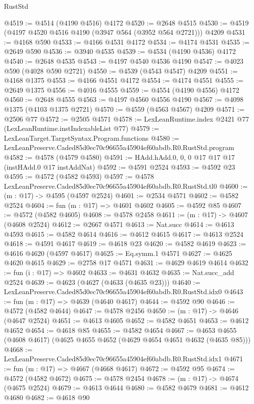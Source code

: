 \begin{lexlean}{RustStd}
\begin{coremodule}
@4519 := @4514 (@4190 @4516) @4172
@4520 := @2648 @4515
@4530 := @4519 (@4197 @4520 @4516 @4190 (@3947 @564 (@3952 @564 @2721))) @4209
@4531 := @4168 @590
@4533 := @4166 @4531 @4172
@4534 := @4174 @4531
@4535 := @2649 @590
@4536 := @3940 @4535
@4539 := @4534 (@4190 @4536) @4172
@4540 := @2648 @4535
@4543 := @4197 @4540 @4536 @4190
@4547 := @4023 @590 (@4028 @590 @2721)
@4550 := @4539 (@4543 @4547) @4209
@4551 := @4168 @1375
@4553 := @4166 @4551 @4172
@4554 := @4174 @4551
@4555 := @2649 @1375
@4556 := @4016 @4555
@4559 := @4554 (@4190 @4556) @4172
@4560 := @2648 @4555
@4563 := @4197 @4560 @4556 @4190
@4567 := @4098 @1375 (@4103 @1375 @2721)
@4570 := @4559 (@4563 @4567) @4209
@4571 := @2506 @77
@4572 := @2505 @4571
@4578 := LexLeanRuntime.index @2421 @77 (LexLeanRuntime.instIndexableList @77)
@4579 := LexLeanTarget.TargetSyntax.Program.functions
@4580 := LexLeanPreserve.Caded85d0ec70c96655a45904ef60abdb.R0.RustStd.program
@4582 := @4578 (@4579 @4580)
@4591 := HAdd.hAdd.{0, 0, 0} @17 @17 @17 (instHAdd.{0} @17 instAddNat)
@4592 := @4591 @2524
@4593 := @4592 @23
@4595 := @4572 (@4582 @4593)
@4597 := @4578 LexLeanPreserve.Caded85d0ec70c96655a45904ef60abdb.R0.RustStd.tl0
@4600 := (m : @17) -> @4595 (@4597 @2524)
@4601 := @2534 @4571
@4602 := @4582 @2524
@4604 := fun (m : @17) => @4601 @4602
@4605 := @4592 @85
@4607 := @4572 (@4582 @4605)
@4608 := @4578 @2458
@4611 := (m : @17) -> @4607 (@4608 @2524)
@4612 := @2667 @4571
@4613 := Nat.succ
@4614 := @4613 @4593
@4615 := @4582 @4614
@4616 := @4612 @4615
@4617 := @4613 @2524
@4618 := @4591 @4617
@4619 := @4618 @23
@4620 := @4582 @4619
@4623 := @4616 @4620 (@4597 @4617)
@4625 := Eq.symm.{1} @4571
@4627 := @4625 @4620 @4615
@4629 := @2758 @17 @4571
@4631 := @4629 @4619 @4614
@4632 := fun (i : @17) => @4602
@4633 := @4631 @4632
@4635 := Nat.succ_add @2524
@4639 := @4623 (@4627 (@4633 (@4635 @23)))
@4640 := LexLeanPreserve.Caded85d0ec70c96655a45904ef60abdb.R0.RustStd.idx0
@4643 := fun (m : @17) => @4639 (@4640 @4617)
@4644 := @4592 @90
@4646 := @4572 (@4582 @4644)
@4647 := @4578 @2456
@4650 := (m : @17) -> @4646 (@4647 @2524)
@4651 := @4613 @4605
@4652 := @4582 @4651
@4653 := @4612 @4652
@4654 := @4618 @85
@4655 := @4582 @4654
@4667 := @4653 @4655 (@4608 @4617) (@4625 @4655 @4652 (@4629 @4654 @4651 @4632 (@4635 @85)))
@4668 := LexLeanPreserve.Caded85d0ec70c96655a45904ef60abdb.R0.RustStd.idx1
@4671 := fun (m : @17) => @4667 (@4668 @4617)
@4672 := @4592 @95
@4674 := @4572 (@4582 @4672)
@4675 := @4578 @2454
@4678 := (m : @17) -> @4674 (@4675 @2524)
@4679 := @4613 @4644
@4680 := @4582 @4679
@4681 := @4612 @4680
@4682 := @4618 @90

\end{coremodule}
\end{lexlean}
